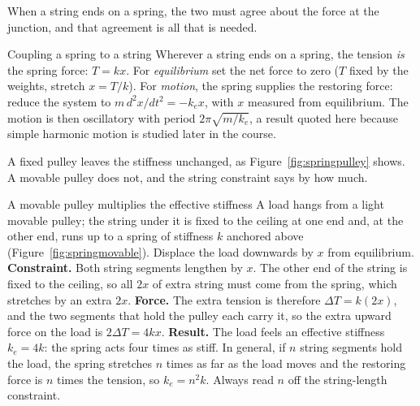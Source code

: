 When a string ends on a spring, the two must agree about the force at the junction, and that agreement is all
that is needed.

\begin{figure}[htbp]
\centering
{}
\end{figure}

\begin{methodbox}{Coupling a spring to a string}
Wherever a string ends on a spring, the tension \emph{is} the spring force: $T=kx$. For \emph{equilibrium}
set the net force to zero ($T$ fixed by the weights, stretch $x=T/k$). For \emph{motion}, the spring
supplies the restoring force: reduce the system to $m\,d^2x/dt^2=-k_e x$, with $x$ measured from
equilibrium. The motion is then oscillatory with period $2\pi\sqrt{m/k_e}$, a result quoted here because
simple harmonic motion is studied later in the course.
\end{methodbox}

A fixed pulley leaves the stiffness unchanged, as Figure~\ref{fig:springpulley} shows. A movable
pulley does not, and the string constraint says by how much.

\begin{figure}[htbp]
\centering
{}
\end{figure}

\begin{derivbox}{A movable pulley multiplies the effective stiffness}
A load hangs from a light movable pulley; the string under it is fixed to the ceiling at one end and, at
the other end, runs up to a spring of stiffness $k$ anchored above (Figure~\ref{fig:springmovable}).
Displace the load downwards by $x$ from equilibrium.
 \textbf{Constraint.} Both string segments lengthen by $x$. The other end of the string is fixed
to the ceiling, so all $2x$ of extra string must come from the spring, which stretches by an extra $2x$.
 \textbf{Force.} The extra tension is therefore $\Delta T=k(2x)$, and the two segments that hold
the pulley each carry it, so the extra upward force on the load is $2\Delta T=4kx$.
 \textbf{Result.} The load feels an effective stiffness $k_e=4k$: the spring acts four times as
stiff. In general, if $n$ string segments hold the load, the spring stretches $n$ times as far as the load
moves and the restoring force is $n$ times the tension, so $k_e=n^2k$. Always read $n$ off the
string-length constraint.
\end{derivbox}

